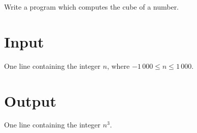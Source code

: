 
Write a program which computes the cube of a number.

\section*{Input}
One line containing the integer $n$, where $-1\,000 \leq n \leq 1\,000$.

\section*{Output}
One line containing the integer $n^3$.
